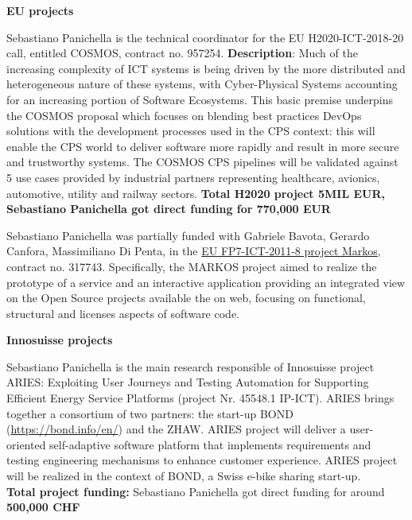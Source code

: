 \documentclass[10pt]{article}
\newcommand{\ins}[1]{\textcolor{blue}{\uline{#1}}} %
\newcommand{\ins}[1]{#1} %
\newcommand\on[1]{\nbc{ON}{#1}{red}} %
\begin{document}
\textbf{EU projects}
\begin{innerlist}
\item Sebastiano Panichella is the technical coordinator for the EU H2020-ICT-2018-20 call, entitled COSMOS, contract no. 957254. \textbf{Description}: Much of the increasing complexity of ICT systems is being driven by the more distributed and heterogeneous nature of these systems, with Cyber-Physical Systems accounting for an increasing portion of Software Ecosystems. This basic premise underpins the COSMOS proposal which focuses on blending best practices DevOps solutions with the development processes used in the CPS context: this will enable the CPS world to deliver software more rapidly and result in more secure and trustworthy systems. 
The COSMOS CPS pipelines will be validated against 5 use cases provided by industrial partners representing healthcare, avionics, automotive, utility and railway sectors.  
\textbf{Total H2020 project 5MIL EUR, Sebastiano Panichella got direct funding for 770,000 EUR} 
   \item Sebastiano Panichella was 
    partially funded with Gabriele Bavota, Gerardo Canfora, Massimiliano Di Penta, in the \href{��http://www.markosproject.eu/��}
                   {EU FP7-ICT-2011-8 project Markos}, contract no. 317743. Specifically, the MARKOS project aimed to realize the prototype of a service and an interactive application providing an integrated view on the Open Source projects available the on web, focusing on functional, structural and licenses aspects of software code. \\
\end{innerlist}
\textbf{Innosuisse projects}
\begin{innerlist}
   \item Sebastiano Panichella is the main research responsible of Innosuisse project ARIES: Exploiting User Journeys and Testing Automation for Supporting Efficient Energy Service Platforms (project Nr. 45548.1 IP-ICT).
ARIES brings together a consortium of two partners: the start-up BOND (\href{https://bond.info/en/}{https://bond.info/en/}) and the ZHAW.
ARIES project will deliver a user-oriented self-adaptive software platform that implements requirements and testing engineering mechanisms to enhance customer experience. ARIES project will be realized in the context of BOND, a Swiss e-bike sharing start-up.\\
\textbf{Total project funding:} Sebastiano Panichella got direct funding for around \textbf{500,000 CHF}\\
\end{innerlist}
\end{document}
